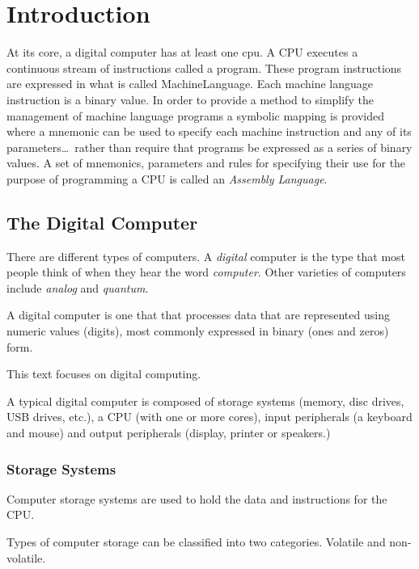 \chapter{Introduction}
\label{chapter:Introduction}

At its core, a digital computer has at least one \acrfull{cpu}.  A
CPU executes a continuous stream of instructions called a \gls{program}.  
These program instructions are expressed in what is called 
\gls{MachineLanguage}.  Each machine language instruction is a binary value.  
In order to provide a method to simplify the management of machine language 
programs a symbolic mapping is provided where a \gls{mnemonic} can be used to 
specify each machine instruction and any of its parameters\ldots\ rather 
than require that programs be expressed as a series of binary values.  
A set of mnemonics, parameters and rules for specifying their use for
the purpose of programming a CPU is called an {\em Assembly Language}.

\section{The Digital Computer}

There are different types of computers.  A {\em digital} computer is
the type that most people think of when they hear the word {\em computer}.
Other varieties of computers include {\em analog} and {\em quantum}.

A digital computer is one that that processes data that are represented
using numeric values (digits), most commonly expressed in binary
(ones and zeros) form.

This text focuses on digital computing.

A typical digital computer is composed of storage systems (memory, disc 
drives, USB drives, etc.), a CPU (with one or more cores), input peripherals 
(a keyboard and mouse) and output peripherals (display, printer or speakers.)

\subsection{Storage Systems}

Computer storage systems are used to hold the data and instructions
for the CPU.

Types of computer storage can be classified into two categories.
Volatile and non-volatile.

